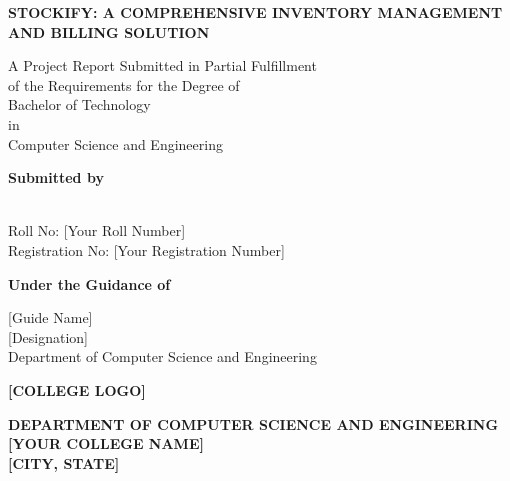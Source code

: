 \thispagestyle{empty}
\begin{center}

\vspace*{0.5cm}

{\fontsize{18}{21.6}\selectfont\bfseries 
STOCKIFY: A COMPREHENSIVE INVENTORY MANAGEMENT \\
AND BILLING SOLUTION}

\vspace{0.8cm}

{\fontsize{14}{16.8}\selectfont
A Project Report Submitted in Partial Fulfillment \\
of the Requirements for the Degree of \\
Bachelor of Technology \\
in \\
Computer Science and Engineering}

\vspace{1.2cm}

{\fontsize{14}{16.8}\selectfont\bfseries
Submitted by}

\vspace{0.3cm}

{\fontsize{14}{16.8} \\
Roll No: [Your Roll Number] \\
Registration No: [Your Registration Number]}

\vspace{1.2cm}

{\fontsize{14}{16.8}\selectfont\bfseries
Under the Guidance of}

\vspace{0.3cm}

{\fontsize{14}{16.8}\selectfont
{[Guide Name]} \\
{[Designation]} \\
Department of Computer Science and Engineering}

\vspace{1.2cm}

{\fontsize{12}{14.4}\selectfont\bfseries [COLLEGE LOGO]} %

\vspace{0.8cm}

{\fontsize{14}{16.8}\selectfont\bfseries
DEPARTMENT OF COMPUTER SCIENCE AND ENGINEERING \\
{[YOUR COLLEGE NAME]} \\
{[CITY, STATE]} \\
\the\year}

\end{center}

\newpage